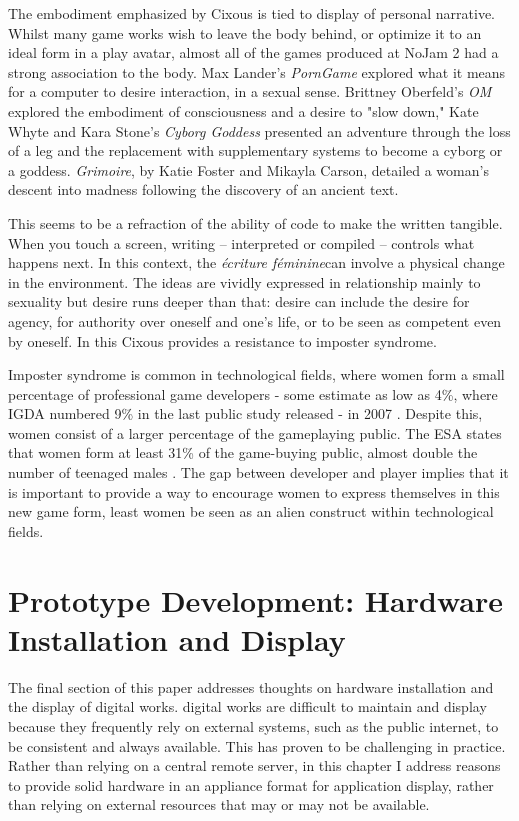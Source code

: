 The embodiment emphasized by Cixous is tied to display of personal narrative. Whilst many game works wish to leave the body behind, or optimize it to an ideal form in a play avatar, almost all of the games produced at NoJam 2 had a strong association to the body. Max Lander's \textit{PornGame} explored what it means for a computer to desire interaction, in a sexual sense. Brittney Oberfeld's \textit{OM} explored the embodiment of consciousness and a desire to "slow down," Kate Whyte and Kara Stone's \textit{Cyborg Goddess} presented an adventure through the loss of a leg and the replacement with supplementary systems to become a cyborg or a goddess. \textit{Grimoire}, by Katie Foster and Mikayla Carson, detailed a woman's descent into madness following the discovery of an ancient text.

This seems to be a refraction of the ability of code to make the written tangible.  When you touch a screen, writing – interpreted or compiled – controls what happens next. In this context, the \textit{écriture féminine}can involve a physical change in the environment. The ideas are vividly expressed in relationship mainly to sexuality but desire runs deeper than that: desire can include the desire for agency, for authority over oneself and one's life, or to be seen as competent even by oneself. In this Cixous provides a resistance to imposter syndrome.

Imposter syndrome is common in technological fields, where women form a small percentage of professional game developers - some estimate as low as 4\%, where IGDA numbered 9\% in the last public study released - in 2007 \cite{igda}. Despite this, women consist of a larger percentage of the gameplaying public. The ESA states that women form at least 31\% of the game-buying public, almost double the number of teenaged males \parencite{esa}. The gap between developer and player implies that it is important to provide a way to encourage women to express themselves in this new game form, least women be seen as an alien construct within technological fields. 

\section{Prototype Development: Hardware Installation and Display}

The final section of this paper addresses thoughts on hardware installation and the display of digital works. digital works are difficult to maintain and display because they frequently rely on external systems, such as the public internet, to be consistent and always available. This has proven to be challenging in practice. Rather than relying on a central remote server, in this chapter I address reasons to provide solid hardware in an appliance format for application display, rather than relying on external resources that may or may not be available. 

